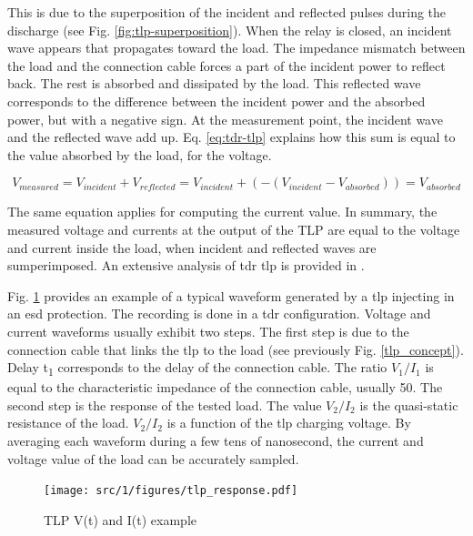 This is due to the superposition of the incident and reflected pulses during the discharge (see Fig. \ref{fig:tlp-superposition}).
When the relay is closed, an incident wave appears that propagates toward the load.
The impedance mismatch between the load and the connection cable forces a part of the incident power to reflect back.
The rest is absorbed and dissipated by the load.
This reflected wave corresponds to the difference between the incident power and the absorbed power, but with a negative sign.
At the measurement point, the incident wave and the reflected wave add up.
Eq. \ref{eq:tdr-tlp} explains how this sum is equal to the value absorbed by the load, for the voltage.

\begin{equation}
V_{measured} = V_{incident} + V_{reflected} = V_{incident} + (- (V_{incident} - V_{absorbed})) = V_{absorbed}
\label{eq:tdr-tlp}
\end{equation}

The same equation applies for computing the current value.
In summary, the measured voltage and currents at the output of the TLP are equal to the voltage and current inside the load, when incident and reflected waves are sumperimposed.
An extensive analysis of \gls{tdr} \gls{tlp} is provided in \cite{phd-monnereau}.

Fig. \ref{fig:typical-tlp-response} provides an example of a typical waveform generated by a \gls{tlp} injecting in an \gls{esd} protection.
The recording is done in a \gls{tdr} configuration.
Voltage and current waveforms usually exhibit two steps.
The first step is due to the connection cable that links the \gls{tlp} to the load (see previously Fig. \ref{tlp_concept}).
Delay \textDelta{}t\textsubscript{1} corresponds to the delay of the connection cable.
The ratio $V_{1}/I_{1}$ is equal to the characteristic impedance of the connection cable, usually 50\textOmega{}.
The second step is the response of the tested load.
The value $V_{2}/I_{2}$ is the quasi-static resistance of the load.
$V_{2}/I_{2}$ is a function of the \gls{tlp} charging voltage.
By averaging each waveform during a few tens of nanosecond, the current and voltage value of the load can be accurately sampled.

\begin{figure}[!h]
  \centering
  \texttt{[image: src/1/figures/tlp\_response.pdf]}
  \caption{TLP V(t) and I(t) example}
  \label{fig:typical-tlp-response}
\end{figure}

